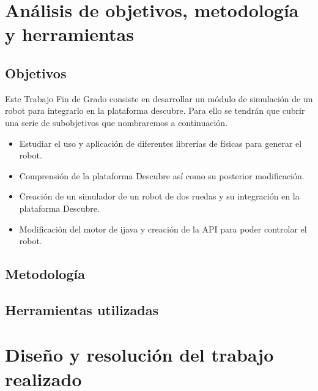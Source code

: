 \chapter{Análisis de objetivos, metodología y herramientas}\label{objetivos-metodologia}

\section{Objetivos}
\label{sec:Objetivos}

Este Trabajo Fin de Grado consiste en desarrollar un módulo de simulación de un robot para integrarlo en la plataforma \Gls{descubre}. Para ello se tendrán que cubrir una serie de subobjetivos que nombraremos a continuación.
\begin{itemize}
\item Estudiar el uso y aplicación de diferentes librerías de físicas para generar el robot.
\item Comprensión de la plataforma Descubre así como su posterior modificación.
\item Creación de un simulador de un robot de dos ruedas y su integración en la plataforma Descubre.
\item Modificación del motor de \gls{ijava} y creación de la \acrshort{API} para poder controlar el robot.
\end{itemize}


\section{Metodología}
\label{sec:metodologia}





\section{Herramientas utilizadas}
\label{sec:herramientas}





\chapter{Diseño y resolución del trabajo realizado}
\label{diseno}




